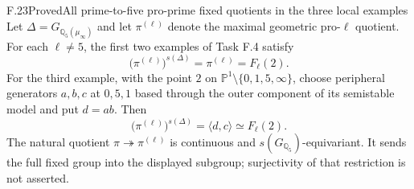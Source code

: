 \begin{statement}{F.23}{Proved}{All prime-to-five pro-prime fixed quotients in the three local examples}
Let $\Delta=G_{\mathbb Q_5(\mu_\infty)}$ and let
$\pi^{(\ell)}$ denote the maximal geometric pro-$\ell$ quotient.
For each $\ell\ne5$, the first two examples of Task F.4 satisfy
\[
  \bigl(\pi^{(\ell)}\bigr)^{s(\Delta)}
       =\pi^{(\ell)}=F_\ell(2).
\]
For the third example, with the point $2$ on
$\mathbb P^1\setminus\{0,1,5,\infty\}$, choose peripheral
generators $a,b,c$ at $0,5,1$ based through the outer component
of its semistable model and put $d=ab$.  Then
\[
 \bigl(\pi^{(\ell)}\bigr)^{s(\Delta)}
                  =\langle d,c\rangle\simeq F_\ell(2).     \tag{F.23}
\]
The natural quotient $\pi\twoheadrightarrow\pi^{(\ell)}$
is continuous and $s(G_{\mathbb Q_5})$-equivariant.  It sends
the full fixed group into the displayed subgroup; surjectivity
of that restriction is not asserted.
\end{statement}
